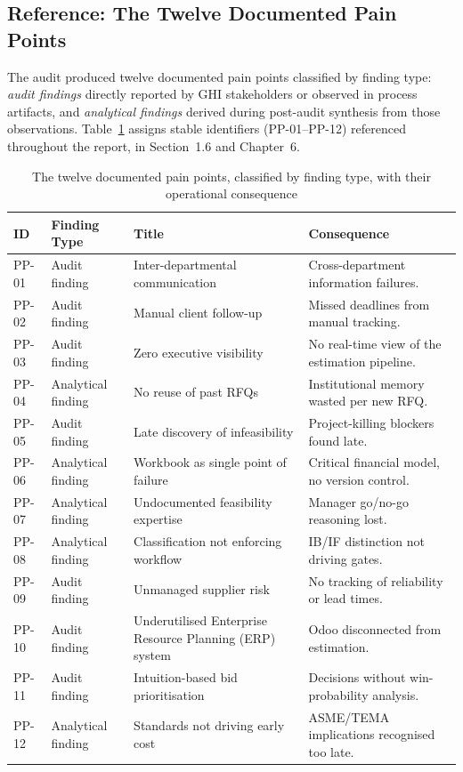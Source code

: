 \subsection{Reference: The Twelve Documented Pain Points}
The audit produced twelve documented pain points classified by finding type: \textit{audit findings} directly reported by GHI stakeholders or observed in process artifacts, and \textit{analytical findings} derived during post-audit synthesis from those observations. Table~\ref{tab:pain_points} assigns stable identifiers (PP-01--PP-12) referenced throughout the report, in Section~1.6 and Chapter~6.

\begin{table}[htbp]
\centering
\renewcommand{\arraystretch}{1.1}
\scriptsize
\begin{tabularx}{\textwidth}{|p{0.8cm}|p{2.2cm}|>{\RaggedRight\arraybackslash}X|>{\RaggedRight\arraybackslash}X|}
\hline
\rowcolor{lightgray}
\textbf{ID} & \textbf{Finding Type} & \textbf{Title} & \textbf{Consequence} \\ \hline
PP-01 & Audit finding & Inter-departmental communication & Cross-department information failures. \\ \hline
PP-02 & Audit finding & Manual client follow-up & Missed deadlines from manual tracking. \\ \hline
PP-03 & Audit finding & Zero executive visibility & No real-time view of the estimation pipeline. \\ \hline
PP-04 & Analytical finding & No reuse of past RFQs & Institutional memory wasted per new RFQ. \\ \hline
PP-05 & Audit finding & Late discovery of infeasibility & Project-killing blockers found late. \\ \hline
PP-06 & Analytical finding & Workbook as single point of failure & Critical financial model, no version control. \\ \hline
PP-07 & Analytical finding & Undocumented feasibility expertise & Manager go/no-go reasoning lost. \\ \hline
PP-08 & Analytical finding & Classification not enforcing workflow & IB/IF distinction not driving gates. \\ \hline
PP-09 & Audit finding & Unmanaged supplier risk & No tracking of reliability or lead times. \\ \hline
PP-10 & Audit finding & Underutilised Enterprise Resource Planning (ERP) system & Odoo disconnected from estimation. \\ \hline
PP-11 & Audit finding & Intuition-based bid prioritisation & Decisions without win-probability analysis. \\ \hline
PP-12 & Analytical finding & Standards not driving early cost & ASME/TEMA implications recognised too late. \\ \hline
\end{tabularx}
\caption{The twelve documented pain points, classified by finding type, with their operational consequence}
\label{tab:pain_points}
\end{table}

